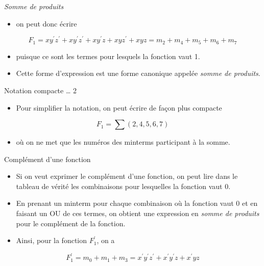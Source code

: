 \documentclass[presentation]{beamer}
\begin{document}
\begin{frame}[label={sec:orgf7cb6d5}]{\emph{Somme de produits}}
\begin{itemize}
\item on peut donc écrire
\end{itemize}

$$ F_1 = x y^\prime
z^\prime + x y^\prime z^\prime + x y^\prime z + x y z^\prime + x y z =
m_2 + m_4 + m_5 + m_6 + m_7 $$

\begin{itemize}
\item puisque ce sont les termes pour lesquels la fonction vaut 1.

\item Cette forme d'expression est une forme canonique appelée \emph{somme de produits}.
\end{itemize}
\end{frame}

\begin{frame}[label={sec:orga662e64}]{Notation compacte \ldots{} 2}
\begin{itemize}
\item Pour simplifier la notation, on peut écrire de façon plus compacte
\end{itemize}

$$F_1 = \sum (2, 4, 5, 6, 7)$$

\begin{itemize}
\item où on ne met que les numéros des minterms participant à la somme.
\end{itemize}
\end{frame}

\begin{frame}[label={sec:org05a0186}]{Complément d'une fonction}
\begin{itemize}
\item Si on veut exprimer le complément d'une fonction, on peut lire dans le tableau de vérité les combinaisons pour lesquelles la fonction vaut 0.

\item En prenant un minterm pour chaque combinaison où la fonction vaut 0 et en faisant un OU de ces termes, on obtient une expression en \emph{somme de produits} pour le complément de la fonction.

\item Ainsi, pour la fonction \(F_1^\prime\), on a
\end{itemize}

$$ F_1^\prime = m_0 + m_1 + m_3 = x^\prime y^\prime z^\prime +
x^\prime y^\prime z + x^\prime y z $$
\end{frame}
\end{document}
